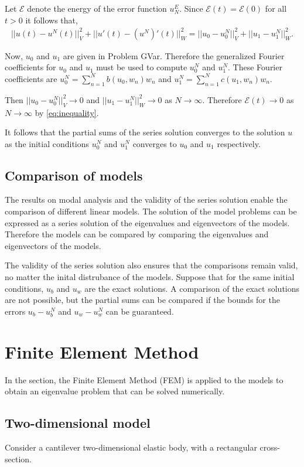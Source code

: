 Let $\mathcal{E}$ denote the energy of the error function $u^E_N$. Since $\mathcal{E}(t) = \mathcal{E}(0)$ for all $t>0$ it follows that, 
\begin{eqnarray}
	||u(t) -  u^N(t)||_V^2 + ||u'(t) - (u^N)'(t)||^2_W = ||u_0 - u^N_0||_V^2 + ||u_1 - u^N_1||_W^2. \label{eq:inequality}
\end{eqnarray}

Now, $u_0$ and $u_1$ are given in Problem GVar. Therefore the generalized Fourier coefficients for $u_0$ and $u_1$ must be used to compute $u_0^N$ and $u_1^N$. These Fourier coefficients are $\displaystyle u_0^N = \sum_{n=1}^{N} b(u_0, w_n)w_n$ and $\displaystyle u_1^N = \sum_{n=1}^{N} c(u_1, w_n)w_n$.

Then $||u_0 - u^N_0||_V^2 \rightarrow 0$ and $||u_1 - u^N_1||_W^2 \rightarrow 0$ as $N \rightarrow \infty$. Therefore $\mathcal{E}(t) \rightarrow 0$ as $N \rightarrow \infty$ by \eqref{eq:inequality}.

It follows that the partial sums of the series solution converges to the solution $u$ as the initial conditions $u_0^N$ and $u_1^N$ converges to $u_0$ and $u_1$ respectively.

\subsection{Comparison of models}
The results on modal analysis and the validity of the series solution enable the comparison of different linear models. The solution of the model problems can be expressed as a series solution of the eigenvalues and eigenvectors of the models. Therefore the models can be compared by comparing the eigenvalues and eigenvectors of the models.

The validity of the series solution also ensures that the comparisons remain valid, no matter the inital distrubance of the models. Suppose that for the same initial conditions, $u_b$ and $u_w$ are the exact solutions. A comparison of the exact solutions are not possible, but the partial sums can be compared if the bounds for the errors $u_b - u^N_b$ and $u_w - u^N_w$ can be guaranteed.

\section{Finite Element Method}
In the section, the Finite Element Method (FEM) is applied to the models to obtain an eigenvalue problem that can be solved numerically.

\subsection{Two-dimensional model}\label{ssec:2D_Model:FEM}
Consider a cantilever two-dimensional elastic body, with a rectangular cross-section.

